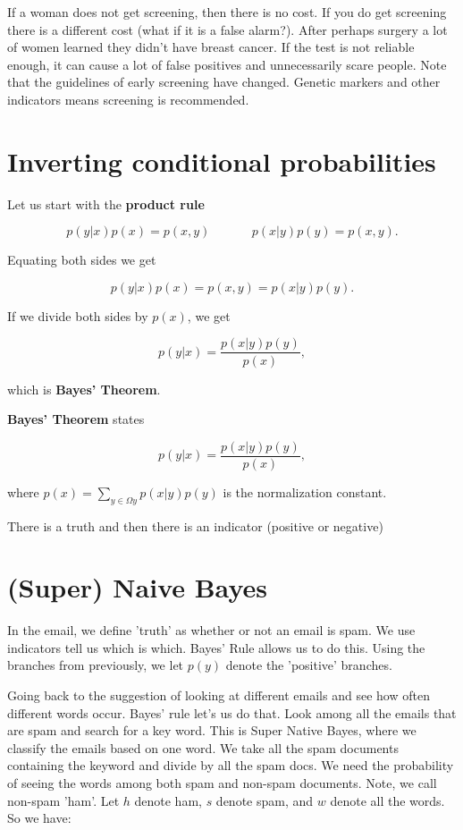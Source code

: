 If a woman does not get screening, then there is no cost. If you do get screening there is a different cost (what if it is a false alarm?). After perhaps surgery a lot of women learned they didn't have breast cancer. If the test is not reliable enough, it can cause a lot of false positives and unnecessarily scare people. Note that the guidelines of early screening have changed. Genetic markers and other indicators means screening is recommended.

\section{Inverting conditional probabilities}

Let us start with the \textbf{product rule}

$$p(y | x) p(x) = p(x, y) ~~~~~~~~~~~~~~~ p(x | y) p(y) = p(x, y).$$

Equating both sides we get

$$p(y | x) p(x) = p(x, y) = p(x | y) p(y).$$

If we divide both sides by $p(x)$, we get

$$p(y | x) = \frac{p(x | y) p(y)}{p(x)},$$

which is \textbf{Bayes' Theorem}.

\begin{theorem}
\textbf{Bayes' Theorem} states 

$$p(y | x) = \frac{p(x | y) p(y)}{p(x)},$$

where $p(x) = \sum_{y \in \Omega y} p(x | y) p(y)$ is the normalization constant. 
\end{theorem}

There is a truth and then there is an indicator (positive or negative)

\section{(Super) Naive Bayes}

In the email, we define 'truth' as whether or not an email is spam. We use indicators tell us which is which. Bayes' Rule allows us to do this. Using the branches from previously, we let $p(y)$ denote the 'positive' branches.

Going back to the suggestion of looking at different emails and see how often different words occur. Bayes' rule let's us do that. Look among all the emails that are spam and search for a key word. This is Super Native Bayes, where we classify the emails based on one word. We take all the spam documents containing the keyword and divide by all the spam docs. We need the probability of seeing the words among both spam and non-spam documents. Note, we call non-spam 'ham'. Let $h$ denote ham, $s$ denote spam, and $w$ denote all the words. So we have:

